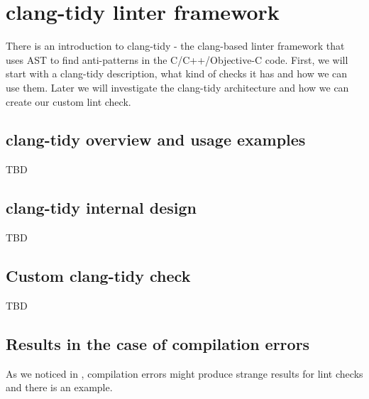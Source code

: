 \chapter{\textbf{clang-tidy linter framework}}
\pagestyle{fancy}
\fancyhf{}
\rhead{\thepage}
There is an introduction to clang-tidy - the clang-based linter framework that
uses AST to find anti-patterns in the C/C++/Objective-C code. First, we will start with
a clang-tidy description, what kind of checks it has and how we can use
them. Later we will investigate the clang-tidy architecture and how we can
create our custom lint check. 
\label{ch:clangtidy}

\section{clang-tidy overview and usage examples}
TBD

\section{clang-tidy internal design}

TBD

\section{Custom clang-tidy check}

TBD

\section{Results in the case of compilation errors}
As we noticed in , compilation errors might produce
strange results for lint checks and there is an example.


